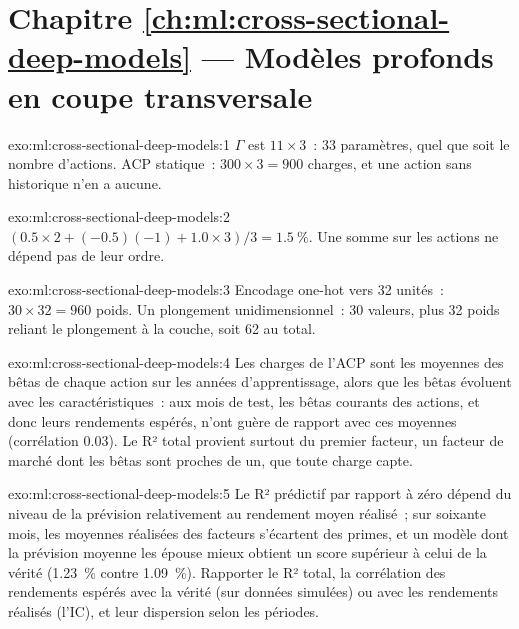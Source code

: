 \section*{Chapitre \ref{ch:ml:cross-sectional-deep-models} --- Modèles profonds en coupe transversale}

\begin{solution}{exo:ml:cross-sectional-deep-models:1}
$\Gamma$ est $11\times3$~: 33 paramètres, quel que soit le nombre d'actions. ACP statique~: $300\times3 = 900$ charges, et une action
sans historique n'en a aucune.
\end{solution}

\begin{solution}{exo:ml:cross-sectional-deep-models:2}
$(0.5\times2 + (-0.5)(-1) + 1.0\times3)/3 = 1.5~\%$. Une somme sur les actions ne dépend pas de leur ordre.
\end{solution}

\begin{solution}{exo:ml:cross-sectional-deep-models:3}
Encodage one-hot vers 32 unités~: $30\times32 = 960$ poids. Un plongement unidimensionnel~: 30 valeurs, plus 32 poids reliant le
plongement à la couche, soit 62 au total.
\end{solution}

\begin{solution}{exo:ml:cross-sectional-deep-models:4}
Les charges de l'ACP sont les moyennes des bêtas de chaque action sur les années d'apprentissage, alors que les bêtas évoluent avec les caractéristiques~:
aux mois de test, les bêtas courants des actions, et donc leurs rendements espérés, n'ont guère de rapport avec ces moyennes
(corrélation 0.03). Le R² total provient surtout du premier facteur, un facteur de marché dont les bêtas sont proches de un, que toute
charge capte.
\end{solution}

\begin{solution}{exo:ml:cross-sectional-deep-models:5}
Le R² prédictif par rapport à zéro dépend du niveau de la prévision relativement au rendement moyen réalisé~; sur soixante
mois, les moyennes réalisées des facteurs s'écartent des primes, et un modèle dont la prévision moyenne les épouse mieux
obtient un score supérieur à celui de la vérité (1.23~\% contre 1.09~\%). Rapporter le R² total, la corrélation des rendements espérés avec la
vérité (sur données simulées) ou avec les rendements réalisés (l'IC), et leur dispersion selon les périodes.
\end{solution}


